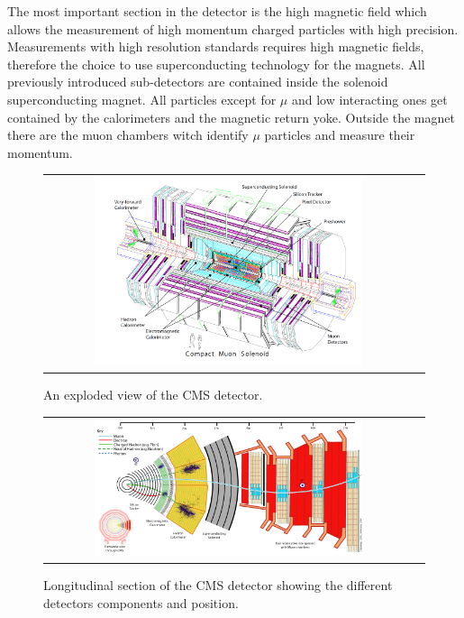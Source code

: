 The most important section in the detector is the high magnetic field which allows the measurement of high momentum charged particles with high precision. Measurements with high resolution standards requires high magnetic fields, therefore the choice to use superconducting technology for the magnets. All previously introduced sub-detectors are contained inside the solenoid superconducting magnet. All particles except for $\mu$ and low interacting ones get contained by the calorimeters and the magnetic return yoke. Outside the magnet there are the muon chambers witch identify $\mu$ particles and measure their momentum.

\begin{figure}[tbh!]
	\centering
	\begin{tabular}{cc}
		\includegraphics[width=0.75\textwidth]{detector/pics/CMS_apparatus.png}
	\end{tabular}
	\caption{An exploded view of the CMS detector.}
	\label{fig:CMS_apparatus}
\end{figure}

\begin{figure}[tbh!]
	\centering
	\begin{tabular}{cc}
		\includegraphics[width=0.75\textwidth]{detector/pics/CMS_slice.png}
	\end{tabular}
	\caption{Longitudinal section of the CMS detector showing the different detectors components and position.}
	\label{fig:CMS_slice}
\end{figure}

